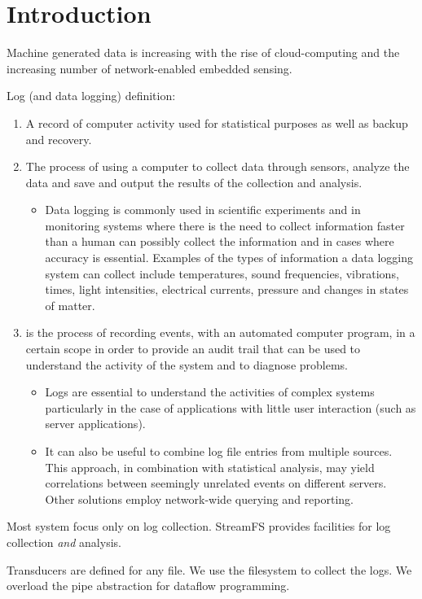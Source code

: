 \section{Introduction}
Machine generated data is increasing with the rise of cloud-computing and the increasing number of network-enabled
embedded sensing.


Log (and data logging) definition:
\begin{enumerate}
\item A record of computer activity used for statistical purposes as well as backup and recovery.
\item The process of using a computer to collect data through sensors, analyze the data and save and output the results of the collection and analysis. 
	\begin{itemize}
		\item Data logging is commonly used in scientific experiments and in monitoring systems where there is the need to collect information faster than a human can possibly collect the information and in cases where accuracy is essential. Examples of the types of information a data logging system can collect include temperatures, sound frequencies, vibrations, times, light intensities, electrical currents, pressure and changes in states of matter.
	\end{itemize}
\item is the process of recording events, with an automated computer program, in a certain scope in order to provide an audit trail that can be used to understand the activity of the system and to diagnose problems.
	\begin{itemize}
		\item Logs are essential to understand the activities of complex systems particularly in the case of applications with little user interaction (such as server applications).
		\item It can also be useful to combine log file entries from multiple sources. This approach, in combination with statistical analysis, may yield correlations between seemingly unrelated events on different servers. Other solutions employ network-wide querying and reporting.
	\end{itemize}
\end{enumerate}

Most system focus only on log collection.  StreamFS provides facilities for log collection \emph{and} analysis.

Transducers are defined for any file.  We use the filesystem to collect the logs.  We overload the pipe abstraction
for dataflow programming.


